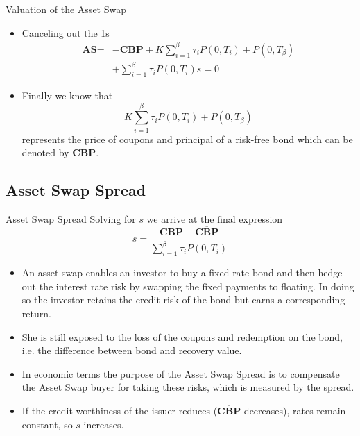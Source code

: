 \documentclass{beamer}
\begin{document}
\begin{frame}{Valuation of the Asset Swap}
	\begin{itemize}
		\item Canceling out the 1s
		\begin{equation*}
			\begin{aligned}
				\textbf{AS}=&-\overline{\textbf{CBP}}+K\sum_{i=1}^\beta\tau_i P(0,T_i) +P(0,T_\beta) \\
				& + \sum_{i=1}^{\beta}\tau_i P(0,T_i)s=0
			\end{aligned}
		\end{equation*}
		\item Finally we know that
		\begin{equation*}
			K\sum_{i=1}^\beta\tau_i P(0,T_i) + P(0,T_\beta)
		\end{equation*}
		represents the price of coupons and principal of a  risk-free bond which can be denoted by \textbf{CBP}.
	\end{itemize}
\end{frame}

\subsection{Asset Swap Spread}
\begin{frame}{Asset Swap Spread}
	Solving for $s$ we arrive at the final expression
	\begin{equation}
		\boxed{s = \frac{\textbf{CBP}-\overline{\textbf{CBP}}}{\sum_{i=1}^{\beta}\tau_iP(0,T_i)}}
	\end{equation}
\myendproof
	\begin{itemize}
	\item<2-> An asset swap enables an investor to buy a fixed rate bond and then hedge out the interest rate risk by swapping the fixed payments to floating. In doing so the investor retains the credit risk of the bond but earns a corresponding return. 
	\item<3-> She is still exposed to the loss of the coupons and redemption on the bond, i.e. the difference between bond and recovery value.
	\item<4-> In economic terms the purpose of the Asset Swap Spread is to compensate the Asset Swap buyer for taking these risks, which is measured by the spread.
	\item<5-> If the credit worthiness of the issuer reduces ($\overline{\textbf{CBP}}$ decreases), rates remain constant, so $s$ increases.
	\end{itemize}
\end{frame}
\end{document}
